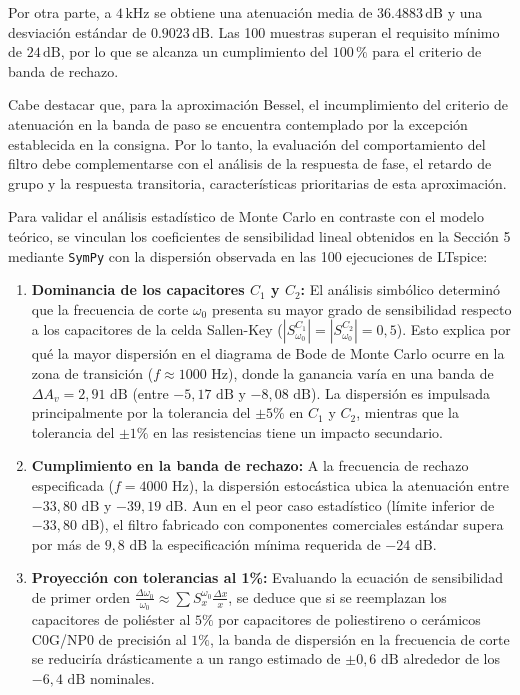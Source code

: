 \documentclass[12pt]{article}
\begin{document}
\begin{itemize}
Por otra parte, a $4\,\text{kHz}$ se obtiene una atenuación media de
$36.4883\,\text{dB}$ y una desviación estándar de
$0.9023\,\text{dB}$. Las 100 muestras superan el requisito mínimo de
$24\,\text{dB}$, por lo que se alcanza un cumplimiento del $100\,\%$
para el criterio de banda de rechazo.

Cabe destacar que, para la aproximación Bessel, el incumplimiento del
criterio de atenuación en la banda de paso se encuentra contemplado
por la excepción establecida en la consigna. Por lo tanto, la
evaluación del comportamiento del filtro debe complementarse con el
análisis de la respuesta de fase, el retardo de grupo y la respuesta
transitoria, características prioritarias de esta aproximación.


Para validar el análisis estadístico de Monte Carlo en contraste con el modelo teórico, se vinculan los coeficientes de sensibilidad lineal obtenidos en la Sección 5 mediante \texttt{SymPy} con la dispersión observada en las 100 ejecuciones de LTspice:

\begin{enumerate}
    \item \textbf{Dominancia de los capacitores $C_1$ y $C_2$:} El análisis simbólico determinó que la frecuencia de corte $\omega_0$ presenta su mayor grado de sensibilidad respecto a los capacitores de la celda Sallen-Key ($|S_{\omega_0}^{C_1}| = |S_{\omega_0}^{C_2}| = 0,5$). Esto explica por qué la mayor dispersión en el diagrama de Bode de Monte Carlo ocurre en la zona de transición ($f \approx 1000\text{ Hz}$), donde la ganancia varía en una banda de $\Delta A_v = 2,91\text{ dB}$ (entre $-5,17\text{ dB}$ y $-8,08\text{ dB}$). La dispersión es impulsada principalmente por la tolerancia del $\pm 5\%$ en $C_1$ y $C_2$, mientras que la tolerancia del $\pm 1\%$ en las resistencias tiene un impacto secundario.
    
    \item \textbf{Cumplimiento en la banda de rechazo:} A la frecuencia de rechazo especificada ($f = 4000\text{ Hz}$), la dispersión estocástica ubica la atenuación entre $-33,80\text{ dB}$ y $-39,19\text{ dB}$. Aun en el peor caso estadístico (límite inferior de $-33,80\text{ dB}$), el filtro fabricado con componentes comerciales estándar supera por más de $9,8\text{ dB}$ la especificación mínima requerida de $-24\text{ dB}$.

    \item \textbf{Proyección con tolerancias al 1\%:} Evaluando la ecuación de sensibilidad de primer orden $\frac{\Delta \omega_0}{\omega_0} \approx \sum S_x^{\omega_0} \frac{\Delta x}{x}$, se deduce que si se reemplazan los capacitores de poliéster al $5\%$ por capacitores de poliestireno o cerámicos C0G/NP0 de precisión al $1\%$, la banda de dispersión en la frecuencia de corte se reduciría drásticamente a un rango estimado de $\pm 0,6\text{ dB}$ alrededor de los $-6,4\text{ dB}$ nominales.
\end{enumerate}


\end{itemize}
\end{document}
